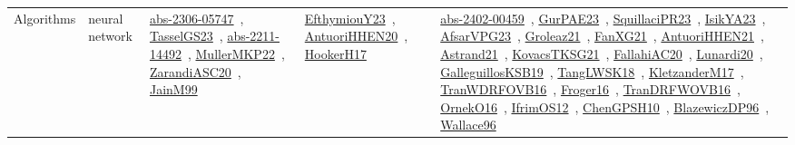 {\begin{longtable}{lp{3cm}>{\raggedright\arraybackslash}p{6cm}>{\raggedright\arraybackslash}p{6cm}>{\raggedright\arraybackslash}p{8cm}}
Algorithms & neural network & \href{../works/abs-2306-05747.pdf}{abs-2306-05747}~\cite{abs-2306-05747}, \href{../works/TasselGS23.pdf}{TasselGS23}~\cite{TasselGS23}, \href{../works/abs-2211-14492.pdf}{abs-2211-14492}~\cite{abs-2211-14492}, \href{../works/MullerMKP22.pdf}{MullerMKP22}~\cite{MullerMKP22}, \href{../works/ZarandiASC20.pdf}{ZarandiASC20}~\cite{ZarandiASC20}, \href{../works/JainM99.pdf}{JainM99}~\cite{JainM99} & \href{../works/EfthymiouY23.pdf}{EfthymiouY23}~\cite{EfthymiouY23}, \href{../works/AntuoriHHEN20.pdf}{AntuoriHHEN20}~\cite{AntuoriHHEN20}, \href{../works/HookerH17.pdf}{HookerH17}~\cite{HookerH17} & \href{../works/abs-2402-00459.pdf}{abs-2402-00459}~\cite{abs-2402-00459}, \href{../works/GurPAE23.pdf}{GurPAE23}~\cite{GurPAE23}, \href{../works/SquillaciPR23.pdf}{SquillaciPR23}~\cite{SquillaciPR23}, \href{../works/IsikYA23.pdf}{IsikYA23}~\cite{IsikYA23}, \href{../works/AfsarVPG23.pdf}{AfsarVPG23}~\cite{AfsarVPG23}, \href{../works/Groleaz21.pdf}{Groleaz21}~\cite{Groleaz21}, \href{../works/FanXG21.pdf}{FanXG21}~\cite{FanXG21}, \href{../works/AntuoriHHEN21.pdf}{AntuoriHHEN21}~\cite{AntuoriHHEN21}, \href{../works/Astrand21.pdf}{Astrand21}~\cite{Astrand21}, \href{../works/KovacsTKSG21.pdf}{KovacsTKSG21}~\cite{KovacsTKSG21}, \href{../works/FallahiAC20.pdf}{FallahiAC20}~\cite{FallahiAC20}, \href{../works/Lunardi20.pdf}{Lunardi20}~\cite{Lunardi20}, \href{../works/GalleguillosKSB19.pdf}{GalleguillosKSB19}~\cite{GalleguillosKSB19}, \href{../works/TangLWSK18.pdf}{TangLWSK18}~\cite{TangLWSK18}, \href{../works/KletzanderM17.pdf}{KletzanderM17}~\cite{KletzanderM17}, \href{../works/TranWDRFOVB16.pdf}{TranWDRFOVB16}~\cite{TranWDRFOVB16}, \href{../works/Froger16.pdf}{Froger16}~\cite{Froger16}, \href{../works/TranDRFWOVB16.pdf}{TranDRFWOVB16}~\cite{TranDRFWOVB16}, \href{../works/OrnekO16.pdf}{OrnekO16}~\cite{OrnekO16}, \href{../works/IfrimOS12.pdf}{IfrimOS12}~\cite{IfrimOS12}, \href{../works/ChenGPSH10.pdf}{ChenGPSH10}~\cite{ChenGPSH10}, \href{../works/BlazewiczDP96.pdf}{BlazewiczDP96}~\cite{BlazewiczDP96}, \href{../works/Wallace96.pdf}{Wallace96}~\cite{Wallace96}\\

\end{longtable}}
